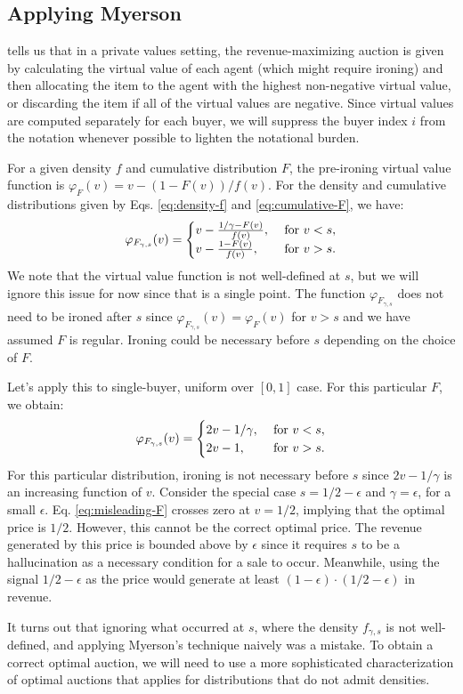 \subsection{Applying Myerson}

\citet{myerson1981optimal} tells us that in a private values setting, the revenue-maximizing auction is given by calculating the virtual value of each agent (which might require ironing) and then allocating the item to the agent with the highest non-negative virtual value, or discarding the item if all of the virtual values are negative. Since virtual values are computed separately for each buyer, we will suppress the buyer index $i$ from the notation whenever possible to lighten the notational burden. 

For a given density $f$ and cumulative distribution $F$, the pre-ironing virtual value function is $\varphi_F(v) = v - (1-F(v))/f(v)$. For the density and cumulative distributions given by Eqs. \eqref{eq:density-f}
 and \eqref{eq:cumulative-F}, we have:
 \[ \varphi_{F_{\gamma,s}}(v) =  
 \begin{cases}
     v - \frac{1/\gamma - F(v)}{f(v)}, &\hbox{ for } v < s,\\
     v - \frac{1 - F(v)}{f(v)}, &\hbox{ for } v > s.\\
 \end{cases}\]
 We note that the virtual value function is not well-defined at $s$, but we will ignore this issue for now since that is a single point. The function $\varphi_{F_{\gamma,s}}$ does not need to be ironed after $s$ since $\varphi_{F_{\gamma,s}}(v) = \varphi_{F} (v)$ for $v > s$ and we have assumed $F$ is regular. Ironing could be necessary before $s$ depending on the choice of $F$. 

 Let's apply this to single-buyer, uniform over $[0,1]$ case. For this particular $F$, we obtain:
  \begin{equation}\label{eq:misleading-F} \varphi_{F_{\gamma,s}}(v) =  
 \begin{cases}
     2v - 1/\gamma, &\hbox{ for } v < s,\\
     2v - 1, &\hbox{ for } v > s.\\
 \end{cases}\end{equation}
 For this particular distribution, ironing is not necessary before $s$ since $2v - 1/\gamma$ is an increasing function of $v$. 
 Consider the special case $s=1/2-\epsilon$ and $\gamma = \epsilon$, for a small $\epsilon$. Eq. \eqref{eq:misleading-F} crosses zero at $v=1/2$, implying that the optimal price is $1/2$. However, this cannot be the correct optimal price. The revenue generated by this price is bounded above by $\epsilon$ since it requires $s$ to be a hallucination as a necessary condition for a sale to occur. Meanwhile, using the signal $1/2-\epsilon$ as the price would generate at least $(1-\epsilon)\cdot(1/2-\epsilon)$ in revenue. 

 It turns out that ignoring what occurred at $s$, where the density $f_{\gamma,s}$ is not well-defined, and applying Myerson's technique naively was a mistake. To obtain a correct optimal auction, we will need to use a more sophisticated characterization of optimal auctions that applies for distributions that do not admit densities. 
